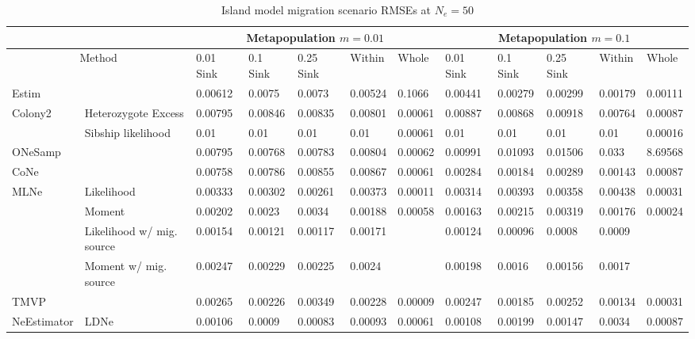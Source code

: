 \begin{landscape}



\begin{table}[h]
\centering \small
\caption[Island model migration scenario RMSEs at $N_e = 50$]{Island model migration scenario RMSEs at $N_e = 50$}
\label{tab:ne2}
\begin{tabular}{ | l | p{2cm}|| l | l | l | l | l || l | l | l | l | l | }
\hline
\multicolumn{2}{c}{ }   & \multicolumn{5}{c}{Metapopulation $m = 0.01$}  & \multicolumn{5}{c}{Metapopulation $m = 0.1$}  \\ \hline
\multicolumn{2}{c}{Method} & 0.01 Sink & 0.1 Sink & 0.25 Sink & Within & Whole & 0.01 Sink & 0.1 Sink & 0.25 Sink & Within & Whole	\\ \hline
Estim 	&   & 0.00612 & 0.0075 & 0.0073 & 0.00524 & 0.1066 & 0.00441 & 0.00279 & 0.00299 & 0.00179 & 0.00111	\\ \hline
Colony2 	& Heterozygote Excess & 0.00795 & 0.00846 & 0.00835 & 0.00801 & 0.00061 & 0.00887 & 0.00868 & 0.00918 & 0.00764 & 0.00087	\\ \hline
 		& Sibship likelihood & 0.01 & 0.01 & 0.01 & 0.01 & 0.00061 & 0.01 & 0.01 & 0.01 & 0.01 & 0.00016	\\ \hline
ONeSamp &  & 0.00795 & 0.00768 & 0.00783 & 0.00804 & 0.00062 & 0.00991 & 0.01093 & 0.01506 & 0.033 & 8.69568	\\ \hline
CoNe 	&   & 0.00758 & 0.00786 & 0.00855 & 0.00867 & 0.00061 & 0.00284 & 0.00184 & 0.00289 & 0.00143 & 0.00087	\\ \hline
MLNe 	& Likelihood & 0.00333 & 0.00302 & 0.00261 & 0.00373 & 0.00011 & 0.00314 & 0.00393 & 0.00358 & 0.00438 & 0.00031	\\ \hline
 		& Moment & 0.00202 & 0.0023 & 0.0034 & 0.00188 & 0.00058 & 0.00163 & 0.00215 & 0.00319 & 0.00176 & 0.00024	\\ \hline
 		& Likelihood w/ mig. source & 0.00154 & 0.00121 & 0.00117 & 0.00171 &  & 0.00124 & 0.00096 & 0.0008 & 0.0009 & 	\\ \hline
 		& Moment w/ mig. source & 0.00247 & 0.00229 & 0.00225 & 0.0024 &  & 0.00198 & 0.0016 & 0.00156 & 0.0017 & 	\\ \hline
TMVP 	&   & 0.00265 & 0.00226 & 0.00349 & 0.00228 & 0.00009 & 0.00247 & 0.00185 & 0.00252 & 0.00134 & 0.00031	\\ \hline
NeEstimator & LDNe & 0.00106 & 0.0009 & 0.00083 & 0.00093 & 0.00061 & 0.00108 & 0.00199 & 0.00147 & 0.0034 & 0.00087	\\ \hline

\end{tabular}
\end{table}
\end{landscape}
